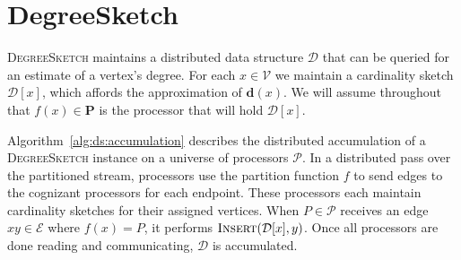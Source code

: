 \documentclass{vldb}
\newcommand{\algoname}[1]{\textnormal{\textsc{#1}}}
\begin{document}
\section{DegreeSketch}
 \label{sec:DS}

\algoname{DegreeSketch} maintains a distributed data structure $\mathcal{D}$ that can be queried for an estimate of a vertex's degree.
For each $x \in \mathcal{V}$ we maintain a cardinality sketch $\mathcal{D}[x]$, which affords the approximation of $\mathbf{d}(x)$. 
We will assume throughout that $f(x) \in \mathbf{P}$ is the processor that will hold $\mathcal{D}[x]$.



Algorithm~\ref{alg:ds:accumulation} describes the distributed accumulation of a \algoname{DegreeSketch} instance on a universe of processors $\mathcal{P}$.
In a distributed pass over the partitioned stream, processors use the partition function $f$ to send edges to the cognizant processors for each endpoint. 
These processors each maintain cardinality sketches for their assigned vertices.
When $P \in \mathcal{P}$ receives an edge $xy \in \mathcal{E}$ where $f(x) = P$, it performs $\algoname{Insert}(\mathcal{D}[x], y)$.
Once all processors are done reading and communicating, $\mathcal{D}$ is accumulated.
\end{document}
